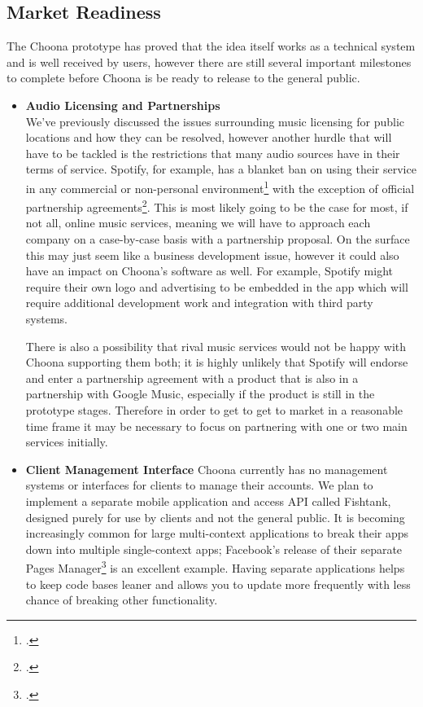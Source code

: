 \subsection{Market Readiness}

The Choona prototype has proved that the idea itself works as a technical system and is well received by users, however there are still several important milestones to complete before Choona is be ready to release to the general public.

\begin{itemize}
  \item \textbf{Audio Licensing and Partnerships}\\
    We've previously discussed the issues surrounding music licensing for public locations and how they can be resolved, however another hurdle that will have to be tackled is the restrictions that many audio sources have in their terms of service. Spotify, for example, has a blanket ban on using their service in any commercial or non-personal environment\footcite{spotifypublic} with the exception of official partnership agreements\footcite{spotifypartners}. This is most likely going to be the case for most, if not all, online music services, meaning we will have to approach each company on a case-by-case basis with a partnership proposal. On the surface this may just seem like a business development issue, however it could also have an impact on Choona's software as well. For example, Spotify might require their own logo and advertising to be embedded in the app which will require additional development work and integration with third party systems.

    There is also a possibility that rival music services would not be happy with Choona supporting them both; it is highly unlikely that Spotify will endorse and enter a partnership agreement with a product that is also in a partnership with Google Music, especially if the product is still in the prototype stages. Therefore in order to get to get to market in a reasonable time frame it may be necessary to focus on partnering with one or two main services initially.

  \item \textbf{Client Management Interface}
    Choona currently has no management systems or interfaces for clients to manage their accounts. We plan to implement a separate mobile application and access API called Fishtank, designed purely for use by clients and not the general public. It is becoming increasingly common for large multi-context applications to break their apps down into multiple single-context apps; Facebook's release of their separate Pages Manager\footcite{facebookpages} is an excellent example. Having separate applications helps to keep code bases leaner and allows you to update more frequently with less chance of breaking other functionality.


\end{itemize}
